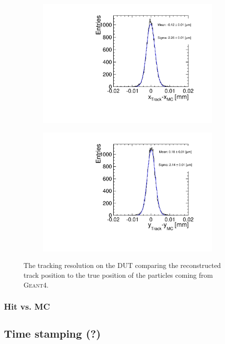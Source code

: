 \begin{figure}[htbp] \centering
  \begin{subfigure}[b]{0.45\textwidth}
    \includegraphics[width=\textwidth]{./figures/Telescope/run49_x_track_MC_DUT.pdf}
    \caption{}
  \end{subfigure}\hfill
  \begin{subfigure}[b]{0.45\textwidth}
    \includegraphics[width=\textwidth]{./figures/Telescope/run49_y_track_MC_DUT.pdf}
    \caption{}
  \end{subfigure}
  \caption{The tracking resolution on the DUT comparing the
    reconstructed track position to the true position of the particles
    coming from \textsc{Geant4}.}
  \label{fig:UnbiasedResidualOnDUT}
\end{figure}



\subsubsection{Hit vs. MC}

\subsection{Time stamping (?)}